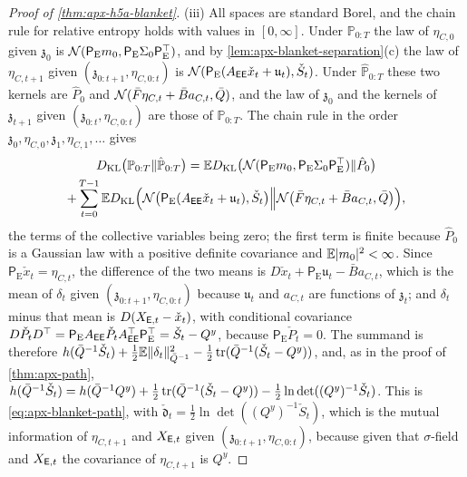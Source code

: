 \begin{proof}[Proof of \cref{thm:apx-h5a-blanket}]
(iii) All spaces are standard Borel, and the chain rule for relative entropy holds with values in $[0,\infty]$. Under $\mathbb P_{0:T}$ the law of $\eta_{C,0}$ given $\mathfrak z_0$ is $\mathcal{N}(\mathsf P_{\mathrm E}m_0,\mathsf P_{\mathrm E}\Sigma_0\mathsf P_{\mathrm E}^\top)$, and by \cref{lem:apx-blanket-separation}(c) the law of $\eta_{C,t+1}$ given $(\mathfrak z_{0:t+1},\eta_{C,0:t})$ is $\mathcal{N}(\mathsf P_{\mathrm E}(A_{\mathsf{E}\mathsf{E}}\check x_t+\mathfrak u_t),\check S_t)$. Under $\hat{\mathbb P}_{0:T}$ these two kernels are $\hat P_0$ and $\mathcal{N}(\bar F\eta_{C,t}+\bar Ba_{C,t},\bar Q)$, and the law of $\mathfrak z_0$ and the kernels of $\mathfrak z_{t+1}$ given $(\mathfrak z_{0:t},\eta_{C,0:t})$ are those of $\mathbb P_{0:T}$. The chain rule in the order $\mathfrak z_0,\eta_{C,0},\mathfrak z_1,\eta_{C,1},\dots$ gives
\begin{equation*}
\begin{gathered}
D_{\mathrm{KL}}\bigl(\mathbb P_{0:T}\Vert\hat{\mathbb P}_{0:T}\bigr)=\mathbb{E}D_{\mathrm{KL}}\bigl(\mathcal{N}(\mathsf P_{\mathrm E}m_0,\mathsf P_{\mathrm E}\Sigma_0\mathsf P_{\mathrm E}^\top)\Vert\hat P_0\bigr)\\
+\sum_{t=0}^{T-1}\mathbb{E}D_{\mathrm{KL}}\Bigl(\mathcal{N}\bigl(\mathsf P_{\mathrm E}(A_{\mathsf{E}\mathsf{E}}\check x_t+\mathfrak u_t),\check S_t\bigr)\Big\Vert\mathcal{N}\bigl(\bar F\eta_{C,t}+\bar Ba_{C,t},\bar Q\bigr)\Bigr),
\end{gathered}
\end{equation*}
the terms of the collective variables being zero; the first term is finite because $\hat P_0$ is a Gaussian law with a positive definite covariance and $\mathbb{E}\lvert m_0\rvert^2<\infty$. Since $\mathsf P_{\mathrm E}\check x_t=\eta_{C,t}$, the difference of the two means is $D\check x_t+\mathsf P_{\mathrm E}\mathfrak u_t-\bar Ba_{C,t}$, which is the mean of $\delta_t$ given $(\mathfrak z_{0:t+1},\eta_{C,0:t})$ because $\mathfrak u_t$ and $a_{C,t}$ are functions of $\mathfrak z_t$; and $\delta_t$ minus that mean is $D(X_{\mathsf{E},t}-\check x_t)$, with conditional covariance $D\check P_tD^\top=\mathsf P_{\mathrm E}A_{\mathsf{E}\mathsf{E}}\check P_tA_{\mathsf{E}\mathsf{E}}^\top\mathsf P_{\mathrm E}^\top=\check S_t-Q^y$, because $\mathsf P_{\mathrm E}\check P_t=0$. The summand is therefore $h(\bar Q^{-1}\check S_t)+\frac12\mathbb{E}\Vert\delta_t\Vert^2_{\bar Q^{-1}}-\frac12\operatorname{tr}(\bar Q^{-1}(\check S_t-Q^y))$, and, as in the proof of \cref{thm:apx-path}, $h(\bar Q^{-1}\check S_t)=h(\bar Q^{-1}Q^y)+\frac12\operatorname{tr}(\bar Q^{-1}(\check S_t-Q^y))-\frac12\ln\det((Q^y)^{-1}\check S_t)$. This is \eqref{eq:apx-blanket-path}, with $\check{\mathfrak d}_t=\frac12\ln\det((Q^y)^{-1}\check S_t)$, which is the mutual information of $\eta_{C,t+1}$ and $X_{\mathsf{E},t}$ given $(\mathfrak z_{0:t+1},\eta_{C,0:t})$, because given that $\sigma$-field and $X_{\mathsf{E},t}$ the covariance of $\eta_{C,t+1}$ is $Q^y$.


\end{proof}
